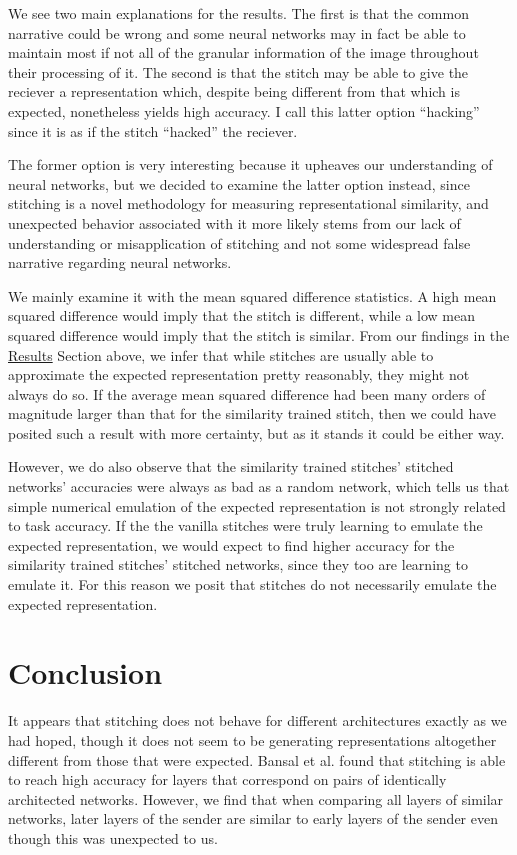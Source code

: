 \documentclass{article} %
\begin{document}
We see two main explanations for the results. The first is that the common narrative could be wrong and some neural
networks may in fact be able to maintain most if not all of the granular information of the image throughout their
processing of it. The second is that the stitch may be able to give the reciever a representation which, despite being
different from that which is expected, nonetheless yields high accuracy. I call this latter option ``hacking'' since it
is as if the stitch ``hacked'' the reciever.

The former option is very interesting because it upheaves our understanding of neural networks, but we decided to
examine the latter option instead, since stitching is a novel methodology for measuring representational
similarity, and unexpected behavior associated with it more likely stems from our lack of understanding or misapplication
of stitching and not some widespread false narrative regarding neural networks.

We mainly examine it with the mean squared difference statistics. A high mean squared difference would
imply that the stitch is different, while a low mean squared difference would imply that the stitch is similar. From our
findings in the \hyperref[Results]{Results} Section above, we infer that while stitches are usually able to approximate
the expected representation pretty reasonably, they might not always do so. If the average mean squared difference
had been many orders of magnitude larger than that for the similarity trained stitch, then we could have posited such
a result with more certainty, but as it stands it could be either way.

However, we do also observe that the similarity trained stitches' stitched networks' accuracies were always as 
bad as a random network, which tells us that simple numerical emulation of the expected representation is not
strongly related to task accuracy. If the the vanilla stitches were truly learning to emulate the expected representation,
we would expect to find higher accuracy for the similarity trained stitches' stitched networks, since they too are
learning to emulate it. For this reason we posit that stitches do not necessarily emulate the expected representation.

\section{Conclusion}
\label{Conclusion}
It appears that stitching does not behave for different architectures exactly as we had hoped, though it does not seem
to be generating representations altogether different from those that were expected. Bansal et al. found that stitching
is able to reach high accuracy for layers that correspond on pairs of identically architected networks. However, we find
that when comparing all layers of similar networks, later layers of the sender are similar to early layers of the sender
even though this was unexpected to us.
\end{document}
